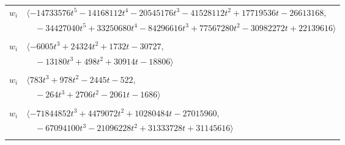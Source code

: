 \documentclass[11pt]{article}
\begin{document}
\begin{longtable}{@{}ll@{}}
$w_i$ & $\langle -14733576t^{5}-14168112t^{4}-20545176t^{3}-41528112t^{2}+17719536t-26613168,$\\
 & $\quad -34427040t^{5}+33250680t^{4}-84296616t^{3}+77567280t^{2}-30982272t+22139616\rangle$\\
\addlinespace[2pt]
\multicolumn{2}{@{}p{0.97\textwidth}@{}}{$i=62$, $D_i=1$, $\rho_{ij}$: $2{:}2, \allowbreak 3{:}2, \allowbreak 6{:}2, \allowbreak 12{:}1, \allowbreak 13{:}1, \allowbreak 18{:}2, \allowbreak 19{:}1, \allowbreak 20{:}2, \allowbreak 22{:}1, \allowbreak 25{:}1, \allowbreak 27{:}1, \allowbreak 32{:}2, \allowbreak 40{:}2, \allowbreak 44{:}2, \allowbreak 51{:}2, \allowbreak 52{:}1, \allowbreak 60{:}2$}\\
$w_i$ & $\langle -6005t^{3}+24324t^{2}+1732t-30727,$\\
 & $\quad -13180t^{3}+498t^{2}+30914t-18806\rangle$\\
\addlinespace[2pt]
\multicolumn{2}{@{}p{0.97\textwidth}@{}}{$i=63$, $D_i=1$, $\rho_{ij}$: $1{:}2, \allowbreak 5{:}1, \allowbreak 9{:}2, \allowbreak 14{:}1, \allowbreak 19{:}2, \allowbreak 21{:}2, \allowbreak 23{:}1, \allowbreak 29{:}1, \allowbreak 32{:}1, \allowbreak 38{:}1, \allowbreak 40{:}1, \allowbreak 59{:}2, \allowbreak 61{:}2, \allowbreak 73{:}1, \allowbreak 82{:}1$}\\
$w_i$ & $\langle 783t^{3}+978t^{2}-2445t-522,$\\
 & $\quad -264t^{3}+2706t^{2}-2061t-1686\rangle$\\
\addlinespace[2pt]
\multicolumn{2}{@{}p{0.97\textwidth}@{}}{$i=64$, $D_i=1$, $\rho_{ij}$: $0{:}2, \allowbreak 1{:}2, \allowbreak 4{:}2, \allowbreak 10{:}2, \allowbreak 13{:}1, \allowbreak 16{:}1, \allowbreak 17{:}1, \allowbreak 18{:}1, \allowbreak 19{:}2, \allowbreak 22{:}2, \allowbreak 27{:}2, \allowbreak 36{:}1, \allowbreak 40{:}1, \allowbreak 41{:}2, \allowbreak 44{:}1, \allowbreak 50{:}1, \allowbreak 53{:}2, \allowbreak 60{:}2, \allowbreak 61{:}1$}\\
$w_i$ & $\langle -71844852t^{3}+4479072t^{2}+10280484t-27015960,$\\
 & $\quad -67094100t^{3}-21096228t^{2}+31333728t+31145616\rangle$\\
\addlinespace[2pt]
\multicolumn{2}{@{}p{0.97\textwidth}@{}}{$i=65$, $D_i=1$, $\rho_{ij}$: $0{:}2, \allowbreak 3{:}1, \allowbreak 16{:}2, \allowbreak 18{:}2, \allowbreak 39{:}1, \allowbreak 50{:}1, \allowbreak 52{:}2, \allowbreak 55{:}2, \allowbreak 66{:}1, \allowbreak 73{:}2, \allowbreak 74{:}2, \allowbreak 86{:}2, \allowbreak 88{:}2, \allowbreak 90{:}1, \allowbreak 93{:}2, \allowbreak 94{:}1, \allowbreak 95{:}2, \allowbreak 96{:}2$}\\

\end{longtable}
\end{document}
